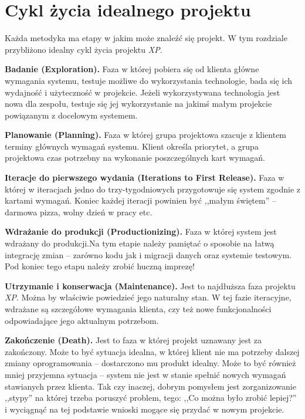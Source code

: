 \section{Cykl życia idealnego projektu}
\label{sec:ZMTOcykl}

Każda metodyka ma etapy w jakim może znaleźć się projekt. W tym rozdziale przybliżono idealny cykl życia projektu \textit{XP}.

\begin{packed_enum}
    \item \textbf{Badanie (Exploration).} Faza w której pobiera się od klienta główne wymagania systemu, testuje możliwe do wykorzystania technologie, bada się ich wydajność i użyteczność w projekcie. Jeżeli wykorzystywana technologia jest nowa dla zespołu, testuje się jej wykorzystanie na jakimś małym projekcie powiązanym z docelowym systemem.
    \item \textbf{Planowanie (Planning).} Faza w której grupa projektowa szacuje z klientem terminy głównych wymagań systemu. Klient określa priorytet, a grupa projektowa czas potrzebny na wykonanie poszczególnych kart wymagań.
    \item \textbf{Iteracje do pierwszego wydania (Iterations to First Release).} Faza w której w iteracjach jedno do trzy-tygodniowych przygotowuje się system zgodnie z kartami wymagań. Koniec każdej iteracji powinien być ,,małym świętem'' -- darmowa pizza, wolny dzień w pracy etc.
    \item \textbf{Wdrażanie do produkcji (Productionizing).} Faza w której system jest wdrażany do produkcji.Na tym etapie należy pamiętać o sposobie na łatwą integrację zmian -- zarówno kodu jak i migracji danych oraz systemie testowym. Pod koniec tego etapu należy zrobić huczną imprezę!
    \item \textbf{Utrzymanie i konserwacja (Maintenance).} Jest to najdłuższa faza projektu \textit{XP}. Można by właściwie powiedzieć jego naturalny stan. W tej fazie iteracyjne, wdrażane są szczegółowe wymagania klienta, czy też nowe funkcjonalności odpowiadające jego aktualnym potrzebom.
    \item \textbf{Zakończenie (Death).} Jest to faza w której projekt uznawany jest za zakończony. Może to być sytuacja idealna, w której klient nie ma potrzeby dalszej zmiany oprogramowania -- dostarczono mu produkt idealny. Może to być również mniej przyjemna sytuacja -- system nie jest w stanie spełnić nowych wymagań stawianych przez klienta. Tak czy inaczej, dobrym pomysłem jest zorganizowanie ,,stypy'' na której trzeba poruszyć problem, tego: ,,Co można było zrobić lepiej?'' i wyciągnąć na tej podstawie wnioski mogące się przydać w nowym projekcie.
\end{packed_enum}

